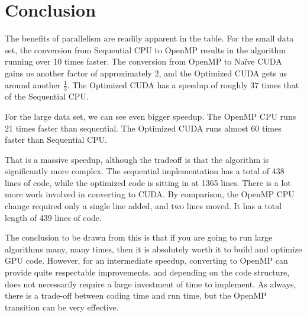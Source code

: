 \documentclass[12pt, oneside]{article}
\begin{document}
\section{Conclusion}
The benefits of parallelism are readily apparent in the table. For the small data set, the conversion from Sequential CPU to OpenMP results in the algorithm running over 10 times faster. The conversion from OpenMP to Na\"ive CUDA gains us another factor of approximately 2, and the Optimized CUDA gets us around another \(\frac{1}{3}\). The Optimized CUDA has a speedup of roughly 37 times that of the Sequential CPU.

For the large data set, we can see even bigger speedup. The OpenMP CPU runs 21 times faster than sequential. The Optimized CUDA runs almost 60 times faster than Sequential CPU.

That is a massive speedup, although the tradeoff is that the algorithm is significantly more complex. The sequential implementation has a total of 438 lines of code, while the optimized code is sitting in at 1365 lines. There is a lot more work involved in converting to CUDA. By comparison, the OpenMP CPU change required only a single line added, and two lines moved. It has a total length of 439 lines of code.

The conclusion to be drawn from this is that if you are going to run large algorithms many, many times, then it is absolutely worth it to build and optimize GPU code. However, for an intermediate speedup, converting to OpenMP can provide quite respectable improvements, and depending on the code structure, does not necessarily require a large investment of time to implement. As always, there is a trade-off between coding time and run time, but the OpenMP transition can be very effective.


\end{document}
